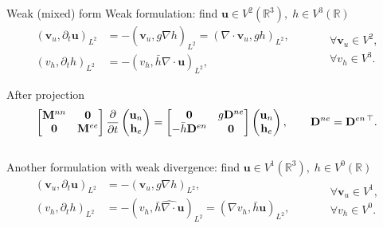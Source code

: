 \documentclass{beamer}
\newcommand{\bbR}{\mathbb{R}}
\begin{document}
\begin{frame}{Weak (mixed) form}
Weak formulation: find $\bm{u} \in V^2(\bbR^3), \; h \in V^3(\bbR)$
\begin{equation*}
	\begin{aligned}
(\bm{v}_u, \partial_t \bm{u})_{L^2} &= -(\bm{v}_u, g \widehat{\nabla} h)_{L^2} = (\nabla \cdot \bm{v}_u, g h)_{L^2}, \\
(v_h, \partial_t h)_{L^2} &= -(v_h, \bar{h} \nabla \cdot \bm{u})_{L^2},
\end{aligned} \qquad 
\begin{aligned}
	&\forall\bm{v}_u \in V^2, \\ &\forall v_h \in V^3.
\end{aligned}
\end{equation*}

After projection
\begin{equation*}
\begin{bmatrix}
	\mathbf{M}^{nn} & \mathbf{0} \\
	\mathbf{0} & \mathbf{M}^{ee}
\end{bmatrix}
\diffp{}{t}
\begin{pmatrix}
	\mathbf{u}_n \\ \mathbf{h}_e
\end{pmatrix} = 
\begin{bmatrix}
	\mathbf{0} & g \mathbf{D}^{ne} \\
	 -\bar{h}\mathbf{D}^{en} & \mathbf{0}
\end{bmatrix}
\begin{pmatrix}
	\mathbf{u}_n \\ \mathbf{h}_e
\end{pmatrix}, \qquad \mathbf{D}^{ne} = \mathbf{D}^{en\, \top}.
\end{equation*}
\vspace{.3cm}\\
Another formulation with weak divergence: find $\bm{u} \in V^1(\bbR^3), \; h \in V^0(\bbR)$
\begin{equation*}
	\begin{aligned}
		(\bm{v}_u, \partial_t \bm{u})_{L^2} &= -(\bm{v}_u, g \nabla h)_{L^2} , \\
		(v_h, \partial_t h)_{L^2} &= -(v_h, \bar{h}\widehat{\nabla \cdot} \bm{u})_{L^2} = (\nabla v_h,  \bar{h}\bm{u})_{L^2},
	\end{aligned} \qquad 
	\begin{aligned}
		&\forall\bm{v}_u \in V^1, \\ &\forall v_h \in V^0.
	\end{aligned}
\end{equation*} 
\end{frame}
\end{document}
